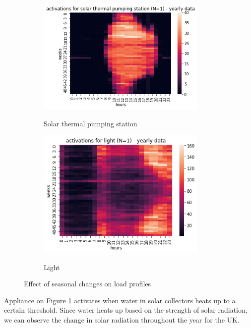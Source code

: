 \begin{figure}[H]
	\begin{subfigure}{.5\textwidth}
		\centering
		\caption{Solar thermal pumping station}
		\includegraphics[width=0.9\textwidth]{../Figures/LPS/solar_thermal_pumping_station.png}
		\label{fig:solar_thermal_pumping_station}
	\end{subfigure}%
	\begin{subfigure}{.5\textwidth}
		\centering
		\caption{Light}
		\includegraphics[width=0.9\textwidth]{../Figures/LPS/light.png}
		\label{fig:light}
	\end{subfigure}%
	\caption{Effect of seasonal changes on load profiles}
	\label{fig:effect_of_season}

\end{figure}

Appliance on Figure \ref{fig:solar_thermal_pumping_station} activates when water in solar collectors heats up to a certain threshold.
Since water heats up based on the strength of solar radiation, we can observe the change in solar radiation throughout the year for the UK. 

